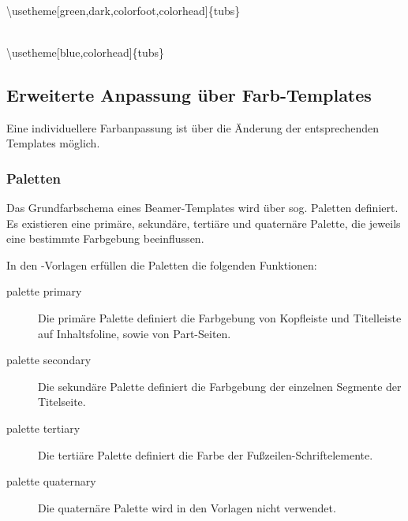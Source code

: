 \begin{center}
\begin{minipage}{0.49\textwidth}
\end{minipage}
\begin{minipage}{0.49\textwidth}
\end{minipage}\medskip\\
{\ttfamily \textbackslash usetheme[green,dark,colorfoot,colorhead]\{tubs\}}
\end{center}

\begin{center}
\begin{minipage}{0.49\textwidth}
\end{minipage}
\begin{minipage}{0.49\textwidth}
\end{minipage}\medskip\\
{\ttfamily%
  \textbackslash usetheme[blue,colorhead]\{tubs\}}
\end{center}

\clearpage
\subsection{Erweiterte Anpassung über Farb-Templates}

Eine individuellere Farbanpassung ist über die Änderung der entsprechenden
Templates möglich.

\subsubsection{Paletten}

Das Grundfarbschema eines Beamer-Templates wird über sog. Paletten definiert.
Es existieren eine primäre, sekundäre, tertiäre und quaternäre Palette,
die jeweils eine bestimmte Farbgebung beeinflussen.

In den \tubslatex-Vorlagen erfüllen die Paletten die folgenden Funktionen:

\begin{description}
  \item[\ttfamily palette primary]
    Die primäre Palette definiert die Farbgebung
    von Kopfleiste und Titelleiste auf Inhaltsfoline,
    sowie von Part-Seiten.
  \item[\ttfamily palette secondary]
    Die sekundäre Palette definiert die Farbgebung der einzelnen
    Segmente der Titelseite.
  \item[\ttfamily palette tertiary]
    Die tertiäre Palette definiert die Farbe der Fußzeilen-Schriftelemente.
  \item[\ttfamily palette quaternary]
    Die quaternäre Palette wird in den Vorlagen nicht verwendet.
\end{description}

